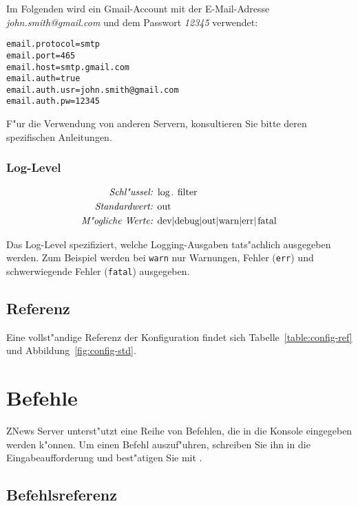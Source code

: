 Im Folgenden wird ein Gmail-Account mit der
E-Mail-Adresse \emph{john.smith@gmail.com} und
dem Passwort \emph{12345} verwendet:

\begin{lstlisting}[]%@formatter:off
email.protocol=smtp
email.port=465
email.host=smtp.gmail.com
email.auth=true
email.auth.usr=john.smith@gmail.com
email.auth.pw=12345
\end{lstlisting}%

F"ur die Verwendung von anderen Servern, konsultieren Sie
bitte deren spezifischen Anleitungen.

\subsubsection{Log-Level}

\begin{align*}
    \emph{Schl"ussel: } & \lstinline{log.filter}\\
    \emph{Standardwert: } & \lstinline{out}\\
    \emph{M"ogliche Werte: } & \lstinline{dev|debug|out|warn|err|fatal}
\end{align*}

Das Log-Level spezifiziert, welche Logging-Ausgaben tats"achlich
ausgegeben werden. Zum Beispiel werden bei \lstinline{warn}
nur Warnungen, Fehler (\lstinline{err}) und schwerwiegende Fehler
(\lstinline{fatal}) ausgegeben.

\subsection{Referenz}

Eine vollst"andige Referenz der Konfiguration
findet sich Tabelle~\ref{table:config-ref}
und Abbildung~\ref{fig:config-std}.

\section{Befehle}

ZNews Server unterst"utzt eine Reihe von Befehlen,
die in die Konsole eingegeben werden k"onnen.
Um einen Befehl auszuf"uhren, schreiben Sie ihn
in die Eingabeaufforderung und best"atigen Sie
mit .

\subsection{Befehlsreferenz}

